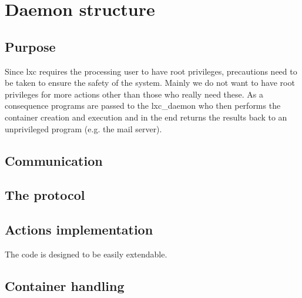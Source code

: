 \chapter{Daemon structure}

\section{Purpose}

Since lxc requires the processing user to have root privileges, precautions need to be taken to ensure
the safety of the system. Mainly we do not want to have root privileges for more actions other than those who really
need these. As a consequence programs are passed to the lxc_daemon who then performs the container creation
and execution and in the end returns the results back to an unprivileged program (e.g. the mail server).

\section{Communication}

\section{The protocol}

\section{Actions implementation}

The code is designed to be easily extendable.

\section{Container handling}
